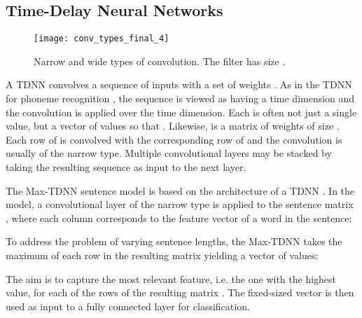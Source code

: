 \documentclass[11pt]{article}
\begin{document}
\subsection{Time-Delay Neural Networks}
\label{tdnn}

\begin{figure}
\centering
\label{conv_types}
{\texttt{[image: conv\_types\_final\_4]}}
\vspace{-0.7cm}
\caption{Narrow and wide types of convolution. The filter  has size . }
\vspace{-0.5cm}
\end{figure}

A TDNN convolves a sequence of inputs  with a set of weights . As in the TDNN for phoneme recognition  \cite{Waibel:1990:PRU:108235.108263}, the sequence  is viewed as having a time dimension and the convolution is applied over the time dimension. Each  is often not just a single value, but a vector of  values so that . Likewise,  is a matrix of weights of size . Each row of  is convolved with the corresponding row of  and the convolution is usually of the narrow type. Multiple convolutional layers may be stacked by taking the resulting sequence  as  input to the next layer. 

The Max-TDNN sentence model  is based on the architecture of a TDNN \cite{collobert:2008}. In the model, a convolutional layer of the narrow type is applied to the sentence matrix , where each column corresponds to the feature vector  of a word in the sentence:

 To address the problem of varying sentence lengths, the Max-TDNN takes the maximum of each row in the resulting matrix  yielding a vector of  values:

The aim is to capture the most relevant feature, i.e. the one with the highest value, for each of the  rows of the resulting matrix . The fixed-sized vector  is then used as input to a fully connected layer for  classification.
\end{document}
